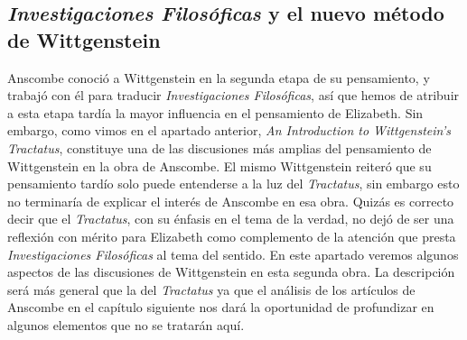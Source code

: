 \subsection{\emph{Investigaciones Filosóficas} y el nuevo método de Wittgenstein}

Anscombe conoció a Wittgenstein en la segunda etapa de su pensamiento, y trabajó con él para traducir \emph{Investigaciones Filosóficas}, así que hemos de atribuir a esta etapa tardía la mayor influencia en el pensamiento de Elizabeth. Sin embargo, como vimos en el apartado anterior, \emph{An Introduction to Wittgenstein's Tractatus}, constituye una de las discusiones más amplias del pensamiento de Wittgenstein en la obra de Anscombe. El mismo Wittgenstein reiteró que su pensamiento tardío solo puede entenderse a la luz del \emph{Tractatus}, sin embargo esto no terminaría de explicar el interés de Anscombe en esa obra. Quizás es correcto decir que el \emph{Tractatus}, con su énfasis en el tema de la verdad, no dejó de ser una reflexión con mérito para Elizabeth como complemento de la atención que presta \emph{Investigaciones Filosóficas} al tema del sentido\autocite[Cf.~][191-193]{teichmann2008ans}. En este apartado veremos algunos aspectos de las discusiones de Wittgenstein en esta segunda obra. La descripción será más general que la del \emph{Tractatus} ya que el análisis de los artículos de Anscombe en el capítulo siguiente nos dará la oportunidad de profundizar en algunos elementos que no se tratarán aquí.

